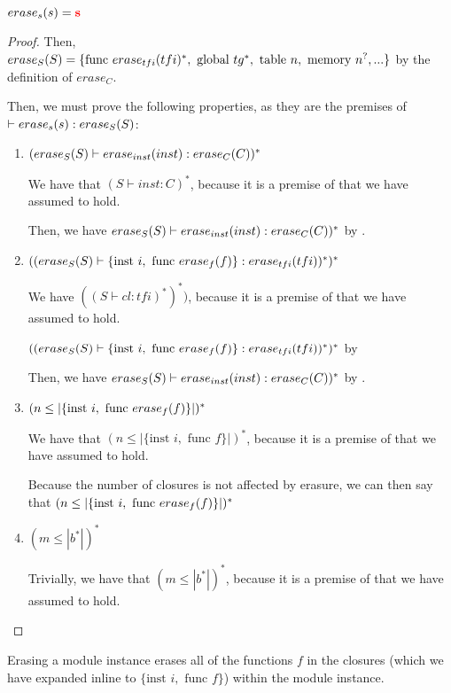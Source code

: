\begin{definition}{$\erase[s]{s} = \mathredbold{s}$}
\begin{proof}
    Then, $\erase[S]{S}=\{\text{func } \erase[tfi]{tfi}^{*}, \text{ global } tg^{*}, \text{ table } n, \text{ memory } n^{?}, ...\}$ by the definition of $erase_C$.

    Then, we must prove the following properties, as they are the premises of $\vdash \erase[s]{s} : \erase[S]{S}$:
    \begin{enumerate}
        \item $(\erase[S]{S} \vdash \erase[inst]{inst} : \erase[C]{C})^{*}$

        We have that $(S \vdash inst : C)^{*}$, because it is a premise of  that we have assumed to hold.

        Then, we have $\erase[S]{S} \vdash \erase[inst]{inst} : \erase[C]{C})^{*}$ by .

        \item $((\erase[S]{S} \vdash \{\text{inst } i, \text{ func } \erase[f]{f}\} : \erase[tfi]{tfi})^{*})^{*}$

        We have $((S \vdash cl :  tfi)^{*})^{*})$, because it is a premise of  that we have assumed to hold.

        $((\erase[S]{S} \vdash \{\text{inst } i, \text{ func } \erase[f]{f}\} : \erase[tfi]{tfi})^{*})^{*}$ by 

        Then, we have $\erase[S]{S} \vdash \erase[inst]{inst} : \erase[C]{C})^{*}$ by .

        \item $(n \leq |\{\text{inst } i, \text{ func } \erase[f]{f}\}|)^{*}$

        We have that $(n \leq |\{\text{inst } i, \text{ func } f\}|)^{*}$, because it is a premise of  that we have assumed to hold.

        Because the number of closures is not affected by erasure, we can then say that $(n \leq |\{\text{inst } i, \text{ func } \erase[f]{f}\}|)^{*}$

        \item $(m \leq |b^{*}|)^{*}$

        Trivially, we have that $(m \leq |b^{*}|)^{*}$, because it is a premise of  that we have assumed to hold.
    \end{enumerate}
\end{proof}

Erasing a module instance erases all of the functions $f$ in the closures (which we have expanded inline to $\{\text{inst } i, \text{ func } f\}$) within the module instance.


\end{definition}
